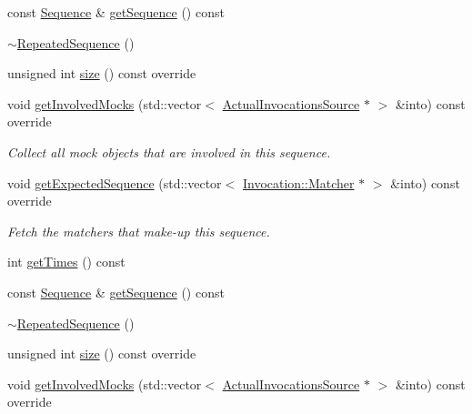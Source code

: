 \begin{DoxyCompactItemize}
\item 
const \mbox{\hyperlink{classfakeit_1_1Sequence}{Sequence}} \& \mbox{\hyperlink{classfakeit_1_1RepeatedSequence_ad85825e1b9a47002d468c85f822d7f5e}{get\+Sequence}} () const
\item 
\mbox{\hyperlink{classfakeit_1_1RepeatedSequence_aa45714780e496cf02e8e35f27de5b617}{$\sim$\+Repeated\+Sequence}} ()
\item 
unsigned int \mbox{\hyperlink{classfakeit_1_1RepeatedSequence_a64d52ac14ca69a34e8188e856e6b51a6}{size}} () const override
\item 
void \mbox{\hyperlink{classfakeit_1_1RepeatedSequence_a4271add0945bdf443562df683e77777d}{get\+Involved\+Mocks}} (std\+::vector$<$ \mbox{\hyperlink{structfakeit_1_1ActualInvocationsSource}{Actual\+Invocations\+Source}} $\ast$ $>$ \&into) const override
\begin{DoxyCompactList}\small\item\em Collect all mock objects that are involved in this sequence. \end{DoxyCompactList}\item 
void \mbox{\hyperlink{classfakeit_1_1RepeatedSequence_a65b5f62fe0ba9da31b99f28c1a2e53f2}{get\+Expected\+Sequence}} (std\+::vector$<$ \mbox{\hyperlink{structfakeit_1_1Invocation_1_1Matcher}{Invocation\+::\+Matcher}} $\ast$ $>$ \&into) const override
\begin{DoxyCompactList}\small\item\em Fetch the matchers that make-\/up this sequence. \end{DoxyCompactList}\item 
int \mbox{\hyperlink{classfakeit_1_1RepeatedSequence_a08eba3d6b4d7740e6a999a75f142948c}{get\+Times}} () const
\item 
const \mbox{\hyperlink{classfakeit_1_1Sequence}{Sequence}} \& \mbox{\hyperlink{classfakeit_1_1RepeatedSequence_ad85825e1b9a47002d468c85f822d7f5e}{get\+Sequence}} () const
\item 
\mbox{\hyperlink{classfakeit_1_1RepeatedSequence_aa45714780e496cf02e8e35f27de5b617}{$\sim$\+Repeated\+Sequence}} ()
\item 
unsigned int \mbox{\hyperlink{classfakeit_1_1RepeatedSequence_a64d52ac14ca69a34e8188e856e6b51a6}{size}} () const override
\item 
void \mbox{\hyperlink{classfakeit_1_1RepeatedSequence_a4271add0945bdf443562df683e77777d}{get\+Involved\+Mocks}} (std\+::vector$<$ \mbox{\hyperlink{structfakeit_1_1ActualInvocationsSource}{Actual\+Invocations\+Source}} $\ast$ $>$ \&into) const override

\end{DoxyCompactItemize}
